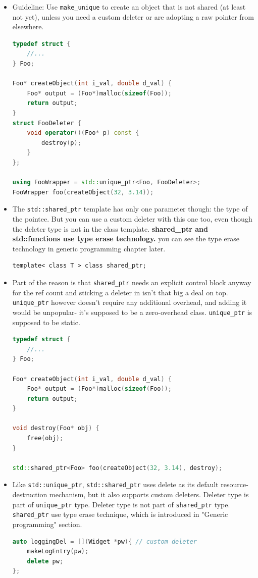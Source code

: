 \documentclass[a4paper,11pt,twoside]{book}
\begin{document}
\begin{itemize}
	\item Guideline: Use \texttt{make\_unique} to create an object that is not shared (at least not yet), unless you need a custom deleter or are adopting a raw pointer from elsewhere.
	
\begin{lstlisting}[frame=single, language=c++]
typedef struct {
	//...
} Foo;

Foo* createObject(int i_val, double d_val) {
	Foo* output = (Foo*)malloc(sizeof(Foo));
	return output;
}
struct FooDeleter {
	void operator()(Foo* p) const {
		destroy(p);
	}
};
	
using FooWrapper = std::unique_ptr<Foo, FooDeleter>;
FooWrapper foo(createObject(32, 3.14));
\end{lstlisting}

	\item The \texttt{std::shared\_ptr} template has only one parameter though: the type of the pointee. But you can use a custom deleter with this one too, even though the deleter type is not in the class template. \textbf{shared\_ptr and std::functions use type erase technology.} you can see the type erase technology in generic programming chapter later.
\begin{lstlisting}
template< class T > class shared_ptr;
\end{lstlisting}
	
	\item Part of the reason is that \texttt{shared\_ptr} needs an explicit control block anyway for the ref count and sticking a deleter in isn't that big a deal on top. \texttt{unique\_ptr} however doesn't require any additional overhead, and adding it would be unpopular- it's supposed to be a zero-overhead class. \texttt{unique\_ptr} is supposed to be static. 
\begin{lstlisting}[frame=single, language=c++]
typedef struct {
	//...
} Foo;

Foo* createObject(int i_val, double d_val) {
	Foo* output = (Foo*)malloc(sizeof(Foo));
	return output;
}

void destroy(Foo* obj) {
	free(obj);
}

std::shared_ptr<Foo> foo(createObject(32, 3.14), destroy);
\end{lstlisting}


\item Like \texttt{std::unique\_ptr}, \texttt{std::shared\_ptr} uses delete as its default resource-destruction mechanism, but it also supports custom deleters. Deleter type is part of \texttt{unique\_ptr} type. Deleter type is not part of \texttt{shared\_ptr} type. \texttt{shared\_ptr} use type erase technique, which is introduced in "Generic programming" section.
\begin{lstlisting}[frame=single, language=c++]
auto loggingDel = [](Widget *pw){ // custom deleter
	makeLogEntry(pw);
	delete pw;
};


\end{lstlisting}
\end{itemize}
\end{document}
